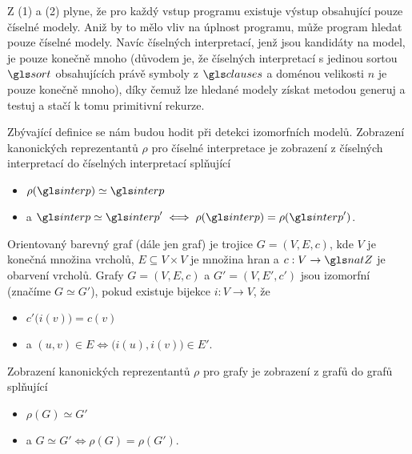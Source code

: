 Z (1) a (2) plyne, že pro každý vstup programu existuje výstup
obsahující pouze číselné modely. Aniž by to mělo vliv na úplnost
programu, může program hledat pouze číselné modely.
Navíc číselných interpretací, jenž jsou kandidáty na model,
je pouze konečně mnoho (důvodem je, že
číselných interpretací s jedinou sortou $\sort$ obsahujících právě symboly
z $\clauses$ a doménou velikosti $n$ je pouze konečně mnoho),
díky čemuž lze hledané
modely získat metodou generuj a testuj a stačí k tomu primitivní rekurze.

Zbývající definice se nám budou hodit při detekci izomorfních modelů.
Zobrazení kanonických reprezentantů $\rho$ pro číselné interpretace
je zobrazení z číselných interpretací do číselných interpretací splňující
\begin{itemize}
\item $\rho(\interp) \simeq \interp$
\item a $\interp \simeq \interp' \iff \rho(\interp) = \rho(\interp')$.
\end{itemize}

Orientovaný barevný graf (dále jen graf) je trojice $G = (V, E, c)$, kde
$V$ je konečná množina vrcholů, $E \subseteq V \times V$ je množina hran
a $c : V \to \natZ$ je obarvení vrcholů. Grafy
$G = (V, E, c)$ a $G' = (V, E', c')$ jsou izomorfní (značíme $G \simeq G'$),
pokud existuje bijekce $i : V \to V$, že
\begin{itemize}
\item $c'\bigl(i(v)\bigr) = c(v)$
\item a $(u, v) \in E \iff \bigl(i(u), i(v)\bigr) \in E'$.
\end{itemize}

Zobrazení kanonických reprezentantů $\rho$ pro grafy
je zobrazení z grafů do grafů splňující
\begin{itemize}
\item $\rho(G) \simeq G'$
\item a $G \simeq G' \iff \rho(G) = \rho(G')$.
\end{itemize}


